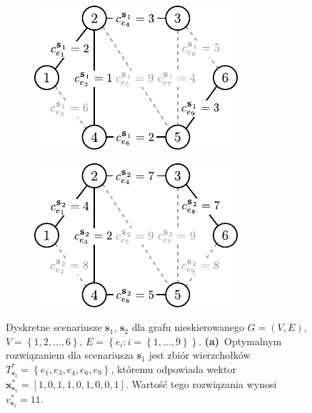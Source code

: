\begin{figure}[!htbp]
	\null\hfill
	\begin{subfigure}[b]{0.35\textwidth}
		\includegraphics[width=\textwidth]{Chapter_II/MIN-MAX-REG-example/a}
		\caption{}
		\label{fig:minmaxregexample:a}
	\end{subfigure}
	\hfill
	\begin{subfigure}[b]{0.35\textwidth}
		\includegraphics[width=\textwidth]{Chapter_II/MIN-MAX-REG-example/b}
		\caption{}
		\label{fig:minmaxregexample:b}
	\end{subfigure}
	\hfill\null
	\caption{
		Dyskretne scenariusze $\textbf{s}_{1}$, $\textbf{s}_{2}$ dla grafu nieskierowanego $G = \left( V, E \right)$, $V = \left\{ 1, 2, \dots, 6 \right\}$, $E = \left\{ e_{i} : i = \left\{ 1, \dots, 9 \right\} \right\}$.
		\textbf{(a)}~Optymalnym rozwiązaniem dla scenariusza $\textbf{s}_{1}$ jest zbiór wierzchołków $T^{\ast}_{\textbf{s}_{1}} = \left\{ e_{1}, e_{3}, e_{4}, e_{6}, e_{9} \right\}$, któremu odpowiada wektor $\textbf{x}^{\ast}_{\textbf{s}_{1}} = \left[ 1, 0, 1, 1, 0, 1, 0, 0, 1 \right]$. Wartość tego rozwiązania wynosi $v^{\ast}_{\textbf{s}_{1}} = 11$.
}
\end{figure}
